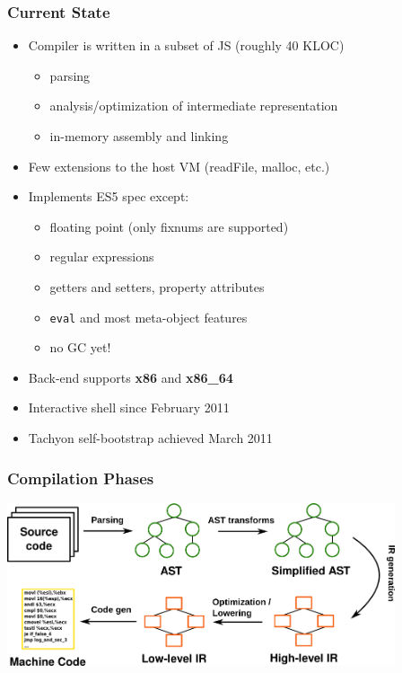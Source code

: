 \begin{frame}
\frametitle{\bf Current State}

  \begin{itemize}

  \item Compiler is written in a subset of JS (roughly 40 KLOC)
    \begin{itemize}
    \item parsing
    \item analysis/optimization of intermediate representation
    \item in-memory assembly and linking
    \end{itemize}
    \smallskip

  \item Few extensions to the host VM (readFile, malloc, etc.)
    \smallskip

  \item Implements ES5 spec except:
    \begin{itemize}
    \item floating point (only fixnums are supported)
    \item regular expressions
    \item getters and setters, property attributes
    \item {\tt eval} and most meta-object features
    \item no GC yet!
    \end{itemize}
    \smallskip

  \item Back-end supports {\bf x86} and {\bf x86\_64}
    \smallskip

  \item Interactive shell since February 2011
    \smallskip

  \item Tachyon self-bootstrap achieved March 2011
    \smallskip

  \end{itemize}
\end{frame}

%
%
\begin{frame}
\frametitle{\bf Compilation Phases}
\begin{center}
\includegraphics[width=4.5in]{images/phases}
\end{center}
\end{frame}


